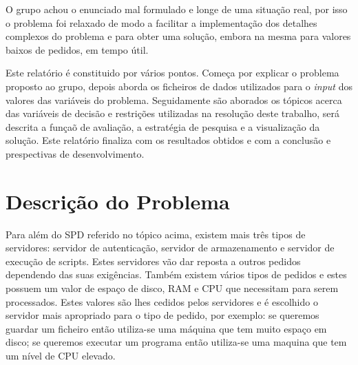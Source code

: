 \documentclass{llncs}
\begin{document}
O grupo achou o enunciado mal formulado e longe de uma situação real, por isso o problema foi relaxado de modo a facilitar a implementação dos detalhes complexos do problema e para obter uma solução, embora na mesma para valores baixos de pedidos, em tempo útil.

Este relatório é constituido por vários pontos. Começa por explicar o problema proposto ao grupo, depois aborda os ficheiros de dados utilizados para o \textit{input} dos valores das variáveis do problema. Seguidamente são aborados os tópicos acerca das variáveis de decisão e restrições utilizadas na resolução deste trabalho, será descrita a funçaõ de avaliação, a estratégia de pesquisa e a visualização da solução. Este relatório finaliza com os resultados obtidos e com a conclusão e prespectivas de desenvolvimento.

\section{Descrição do Problema}\label{sec:Problem Description}
Para além do SPD referido no tópico acima, existem mais três tipos de servidores: servidor de autenticação, servidor de armazenamento e servidor de execução de scripts. Estes servidores vão dar reposta a outros pedidos dependendo das suas exigências.
Também existem vários tipos de pedidos e estes possuem um valor de espaço de disco, RAM e CPU que necessitam para serem processados. Estes valores são lhes cedidos pelos servidores e é escolhido o servidor mais apropriado para o tipo de pedido, por exemplo: se queremos guardar um ficheiro então utiliza-se uma máquina que tem muito espaço em disco; se queremos executar um programa então utiliza-se uma maquina que tem um nível de CPU elevado.
\end{document}
